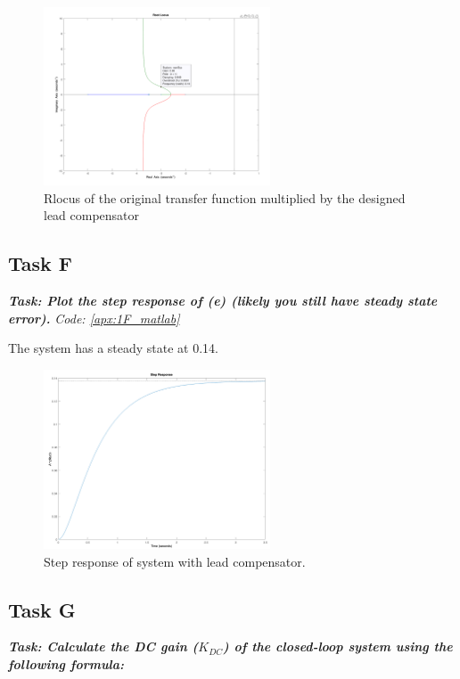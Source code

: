 \begin{figure}[h!]
    \centering
    \includegraphics[width = 0.6\textwidth]{Images/1E_Rlocus.png}
    \caption{Rlocus of the original transfer function multiplied by the designed lead compensator}
    \label{fig:1E_Rlocus}
\end{figure}

\subsection{Task F}
\textbf{\textit{Task:  Plot the step response of (e) (likely you still have steady state error).}}
\newline
\textit{Code: \ref{apx:1F_matlab}}

The system has a steady state at 0.14. 
\begin{figure}[h!]
    \centering
    \includegraphics[width = 0.6\textwidth]{Images/1F_Step.png}
    \caption{Step response of system with lead compensator.}
    \label{fig:1E_Step}
\end{figure}

\subsection{Task G}
\textbf{\textit{Task: Calculate the DC gain ($K_{DC}$) of the closed-loop system using the following formula:}}

